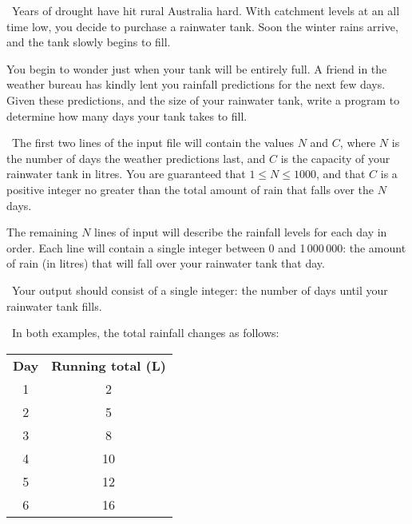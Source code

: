 

\Question\ \quad Years of drought have hit rural Australia hard.
With catchment levels at an all time low, you decide to purchase a rainwater tank. Soon
the winter rains arrive, and the tank slowly begins to fill.

You begin to wonder just when your tank will be entirely full. A friend
in the weather bureau has kindly lent you rainfall predictions for the next few days.
Given these predictions, and the size of your rainwater tank, write a program to determine
how many days your tank takes to fill.

\Input\ The first two lines of the input file will contain the values $N$ and $C$, where
$N$ is the number of days the weather predictions last, and $C$ is the capacity of your
rainwater tank in litres.  You are guaranteed that $1 \le N \le 1000$, and that $C$ is a
positive integer no greater than the total amount of rain that falls over the $N$ days.

The remaining $N$ lines of input will describe the rainfall levels for each day in order.
Each line will contain a single integer between 0 and 1\,000\,000: the amount of rain (in
litres) that will fall over your rainwater tank that day.

\Output\ Your output should consist of a single integer: the number of days until your
rainwater tank fills.

\Sample



\Explanation\ In both examples, the total rainfall changes as follows:

\begin{center}
\begin{tabular}{cc}
  \textbf{Day} & \textbf{Running total (L)} \\[3pt]
  1 & 2 \\[1pt]
  2 & 5 \\[1pt]
  3 & 8 \\[1pt]
  4 & 10 \\[1pt]
  5 & 12 \\[1pt]
  6 & 16 \\[1pt]
\end{tabular}
\end{center}
\vspace{12pt}

